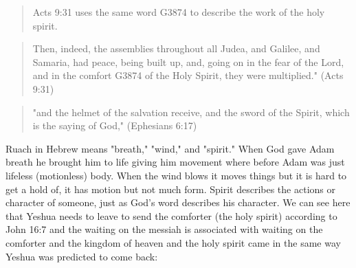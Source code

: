 \documentclass[11pt]{article}
\begin{document}
\begin{quote}
Acts 9:31 uses the same word G3874 to describe the work of the holy spirit.
\end{quote}
\begin{quote}
 Then, indeed, the assemblies throughout all Judea, and Galilee, and Samaria, had peace, being built up, and, going on in the fear of the Lord, and in the comfort G3874 of the Holy Spirit, they were multiplied." (Acts 9:31)
\end{quote}
\begin{quote}
"and the helmet of the salvation receive, and the sword of the Spirit, which is the saying of God," (Ephesians 6:17)
\end{quote}
Ruach in Hebrew means "breath," "wind," and "spirit." When God gave Adam breath he brought him to life giving him movement where before Adam was just lifeless (motionless) body. When the wind blows it moves things but it is hard to get a hold of, it has motion but not much form. Spirit describes the actions or character of someone, just as God's word describes his character. We can see here that Yeshua needs to leave to send the comforter (the holy spirit) according to John 16:7 and the waiting on the messiah is associated with waiting on the comforter and the kingdom of heaven and the holy spirit came in the same way Yeshua was predicted to come back:
\end{document}
